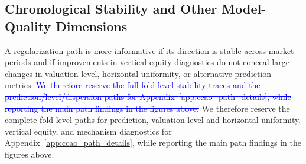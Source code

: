 \documentclass[10pt]{article}
\theoremstyle{definition}
\newcommand{\1}{\mathbf{1}}
\newcommand{\oldtext}[1]{\textcolor{blue}{\sout{#1}}}
\newcommand{\latesttext}[1]{\textcolor{latestPurple}{#1}}
\begin{document}
\subsection{Chronological Stability and Other Model-Quality Dimensions}
\label{subsec:path_stability_results}

A regularization path is more informative if its direction is stable across market
periods and if improvements in vertical-equity diagnostics do not conceal large
changes in valuation level, horizontal uniformity, or alternative prediction
metrics. \oldtext{We therefore reserve the full fold-level stability traces and the
prediction/level/dispersion paths for Appendix~\ref{app:ccao_path_details}, while
reporting the main path findings in the figures above.}
\latesttext{We therefore reserve the complete fold-level paths for prediction, valuation level and horizontal uniformity, vertical equity, and mechanism diagnostics for Appendix~\ref{app:ccao_path_details}, while reporting the main path findings in the figures above.}
\end{document}
